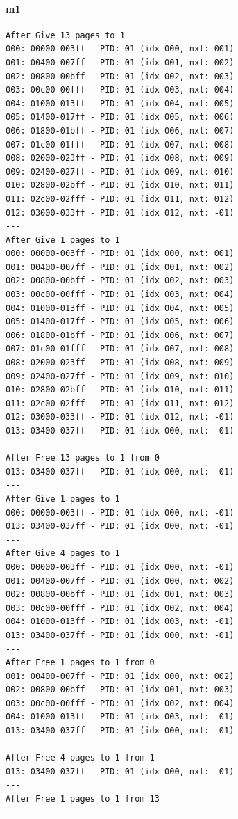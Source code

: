\documentclass[]{article}
\let\oldparagraph\paragraph
\renewcommand{\paragraph}[1]{\oldparagraph{#1}\mbox{}}
\begin{document}
\paragraph{m1}\label{m1}

\begin{verbatim}
After Give 13 pages to 1
000: 00000-003ff - PID: 01 (idx 000, nxt: 001)
001: 00400-007ff - PID: 01 (idx 001, nxt: 002)
002: 00800-00bff - PID: 01 (idx 002, nxt: 003)
003: 00c00-00fff - PID: 01 (idx 003, nxt: 004)
004: 01000-013ff - PID: 01 (idx 004, nxt: 005)
005: 01400-017ff - PID: 01 (idx 005, nxt: 006)
006: 01800-01bff - PID: 01 (idx 006, nxt: 007)
007: 01c00-01fff - PID: 01 (idx 007, nxt: 008)
008: 02000-023ff - PID: 01 (idx 008, nxt: 009)
009: 02400-027ff - PID: 01 (idx 009, nxt: 010)
010: 02800-02bff - PID: 01 (idx 010, nxt: 011)
011: 02c00-02fff - PID: 01 (idx 011, nxt: 012)
012: 03000-033ff - PID: 01 (idx 012, nxt: -01)
---
After Give 1 pages to 1
000: 00000-003ff - PID: 01 (idx 000, nxt: 001)
001: 00400-007ff - PID: 01 (idx 001, nxt: 002)
002: 00800-00bff - PID: 01 (idx 002, nxt: 003)
003: 00c00-00fff - PID: 01 (idx 003, nxt: 004)
004: 01000-013ff - PID: 01 (idx 004, nxt: 005)
005: 01400-017ff - PID: 01 (idx 005, nxt: 006)
006: 01800-01bff - PID: 01 (idx 006, nxt: 007)
007: 01c00-01fff - PID: 01 (idx 007, nxt: 008)
008: 02000-023ff - PID: 01 (idx 008, nxt: 009)
009: 02400-027ff - PID: 01 (idx 009, nxt: 010)
010: 02800-02bff - PID: 01 (idx 010, nxt: 011)
011: 02c00-02fff - PID: 01 (idx 011, nxt: 012)
012: 03000-033ff - PID: 01 (idx 012, nxt: -01)
013: 03400-037ff - PID: 01 (idx 000, nxt: -01)
---
After Free 13 pages to 1 from 0
013: 03400-037ff - PID: 01 (idx 000, nxt: -01)
---
After Give 1 pages to 1
000: 00000-003ff - PID: 01 (idx 000, nxt: -01)
013: 03400-037ff - PID: 01 (idx 000, nxt: -01)
---
After Give 4 pages to 1
000: 00000-003ff - PID: 01 (idx 000, nxt: -01)
001: 00400-007ff - PID: 01 (idx 000, nxt: 002)
002: 00800-00bff - PID: 01 (idx 001, nxt: 003)
003: 00c00-00fff - PID: 01 (idx 002, nxt: 004)
004: 01000-013ff - PID: 01 (idx 003, nxt: -01)
013: 03400-037ff - PID: 01 (idx 000, nxt: -01)
---
After Free 1 pages to 1 from 0
001: 00400-007ff - PID: 01 (idx 000, nxt: 002)
002: 00800-00bff - PID: 01 (idx 001, nxt: 003)
003: 00c00-00fff - PID: 01 (idx 002, nxt: 004)
004: 01000-013ff - PID: 01 (idx 003, nxt: -01)
013: 03400-037ff - PID: 01 (idx 000, nxt: -01)
---
After Free 4 pages to 1 from 1
013: 03400-037ff - PID: 01 (idx 000, nxt: -01)
---
After Free 1 pages to 1 from 13
---

\end{verbatim}
\end{document}
